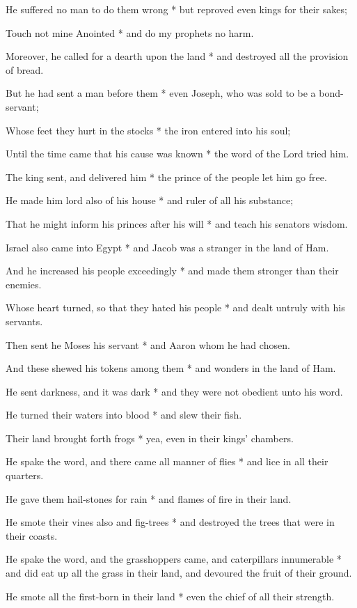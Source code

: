 He suffered no man to do them wrong * but reproved even kings for their sakes;

Touch not mine Anointed * and do my prophets no harm.

Moreover, he called for a dearth upon the land * and destroyed all the provision of bread.

But he had sent a man before them * even Joseph, who was sold to be a bond-servant;

Whose feet they hurt in the stocks * the iron entered into his soul;

Until the time came that his cause was known * the word of the Lord tried him.

The king sent, and delivered him * the prince of the people let him go free.

He made him lord also of his house * and ruler of all his substance;

That he might inform his princes after his will * and teach his senators wisdom.

Israel also came into Egypt * and Jacob was a stranger in the land of Ham.

And he increased his people exceedingly * and made them stronger than their enemies.

Whose heart turned, so that they hated his people * and dealt untruly with his servants.

Then sent he Moses his servant * and Aaron whom he had chosen.

And these shewed his tokens among them * and wonders in the land of Ham.

He sent darkness, and it was dark * and they were not obedient unto his word.

He turned their waters into blood * and slew their fish.

Their land brought forth frogs * yea, even in their kings' chambers.

He spake the word, and there came all manner of flies * and lice in all their quarters.

He gave them hail-stones for rain * and flames of fire in their land.

He smote their vines also and fig-trees * and destroyed the trees that were in their coasts.

He spake the word, and the grasshoppers came, and caterpillars innumerable * and did eat up all the grass in their land, and devoured the fruit of their ground.

He smote all the first-born in their land * even the chief of all their strength.

